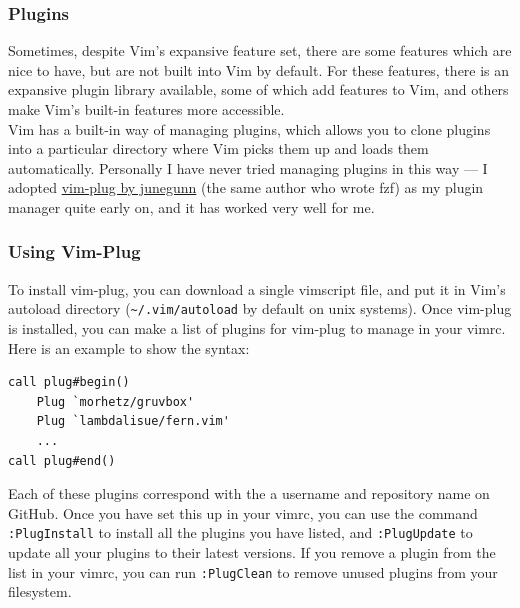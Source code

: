 \documentclass{beamer}
\begin{document}
\begin{frame}[fragile]
    \frametitle{Plugins}
    \small
    Sometimes, despite Vim's expansive feature set, there are some features which are nice to have, but are not built into Vim by default. For these features, there is an expansive plugin library available, some of which add features to Vim, and others make Vim's built-in features more accessible.\\
    \vspace{0.5cm}
    Vim has a built-in way of managing plugins, which allows you to clone plugins into a particular directory where Vim picks them up and loads them automatically. Personally I have never tried managing plugins in this way --- I adopted \href{https://github.com/junegunn/vim-plug}{vim-plug by junegunn} (the same author who wrote fzf) as my plugin manager quite early on, and it has worked very well for me.
\end{frame}

\begin{frame}[fragile]
    \frametitle{Using Vim-Plug}
    \small
    To install vim-plug, you can download a single vimscript file, and put it in Vim's autoload directory (\verb+~/.vim/autoload+ by default on unix systems). Once vim-plug is installed, you can make a list of plugins for vim-plug to manage in your vimrc. Here is an example to show the syntax:\\
    \begin{verbatim}
call plug#begin()
    Plug `morhetz/gruvbox'
    Plug `lambdalisue/fern.vim'
    ...
call plug#end()
    \end{verbatim}
    Each of these plugins correspond with the a username and repository name on GitHub. Once you have set this up in your vimrc, you can use the command \verb+:PlugInstall+ to install all the plugins you have listed, and \verb+:PlugUpdate+ to update all your plugins to their latest versions. If you remove a plugin from the list in your vimrc, you can run \verb+:PlugClean+ to remove unused plugins from your filesystem.
\end{frame}
\end{document}
